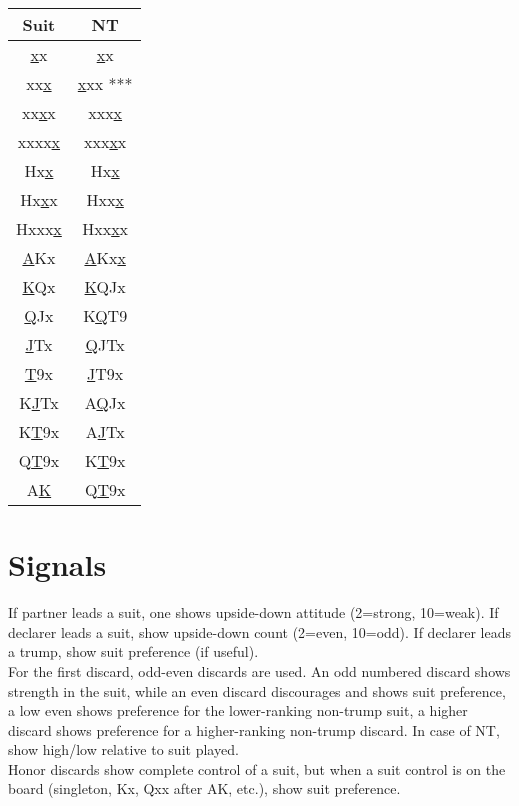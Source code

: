 \documentclass[12pt]{report}
\newcommand{\n}{\\}
\begin{document}
    \newcommand{\uu}[1]{\underline{#1}}
    \begin{center}
        \begin{tabular}{ |c|c| } 
            \hline
            Suit & NT \n
            \hline
            \uu{x}x & \uu{x}x\n
            xx\uu{x} & \uu{x}xx ***\n
            xx\uu{x}x & xxx\uu{x}\n
            xxxx\uu{x} & xxx\uu{x}x\n
            Hx\uu{x} & Hx\uu{x}\n
            Hx\uu{x}x & Hxx\uu{x}\n
            Hxxx\uu{x} & Hxx\uu{x}x\n
            \uu{A}Kx & \uu{A}Kx\uu{x}\n
            \uu{K}Qx & \uu{K}QJx\n
            \uu{Q}Jx & K\uu{Q}T9\n
            \uu{J}Tx & \uu{Q}JTx\n
            \uu{T}9x & \uu{J}T9x\n
            K\uu{J}Tx & A\uu{Q}Jx\n
            K\uu{T}9x & A\uu{J}Tx\n
            Q\uu{T}9x & K\uu{T}9x\n
            A\uu{K} & Q\uu{T}9x\n
            \hline
        \end{tabular}
    \end{center}

\section{Signals}

    If partner leads a suit, one shows upside-down attitude (2=strong, 10=weak).  If declarer leads a suit, show upside-down count (2=even, 10=odd).  If declarer leads a trump, show suit preference (if useful). \n

    For the first discard, odd-even discards are used.  An odd numbered discard shows strength in the suit, while an even discard discourages and shows suit preference, a low even shows preference for the lower-ranking non-trump suit, a higher discard shows preference for a higher-ranking non-trump discard.  In case of NT, show high/low relative to suit played.\n

    Honor discards show complete control of a suit, but when a suit control is on the board (singleton, Kx, Qxx after AK, etc.), show suit preference.\n
\end{document}
